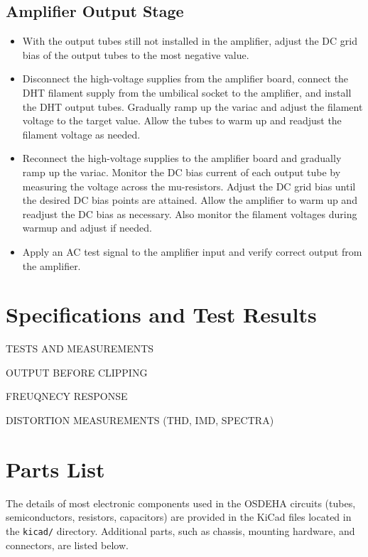 \subsection{Amplifier Output Stage}
\begin{itemize}
\item With the output tubes still not installed in the amplifier, adjust the DC grid bias of the output tubes to the most negative value.
\item Disconnect the high-voltage supplies from the amplifier board, connect the DHT filament supply from the umbilical socket to the amplifier, and install the DHT output tubes. Gradually ramp up the variac and adjust the filament voltage to the target value. Allow the tubes to warm up and readjust the filament voltage as needed.
\item Reconnect the high-voltage supplies to the amplifier board and gradually ramp up the variac. Monitor the DC bias current of each output tube by measuring the voltage across the mu-resistors. Adjust the DC grid bias until the desired DC bias points are attained. Allow the amplifier to warm up and readjust the DC bias as necessary. Also monitor the filament voltages during warmup and adjust if needed.
\item Apply an AC test signal to the amplifier input and verify correct output from the amplifier.

\end{itemize}


\section{Specifications and Test Results}

TESTS AND MEASUREMENTS

OUTPUT BEFORE CLIPPING

FREUQNECY RESPONSE

DISTORTION MEASUREMENTS (THD, IMD, SPECTRA)


\section{Parts List}

The details of most electronic components used in the OSDEHA circuits (tubes, semiconductors, resistors, capacitors) are provided in the KiCad files located in the {\tt kicad/} directory.\cite{osdeha_github} Additional parts, such as chassis, mounting hardware, and connectors, are listed below.


